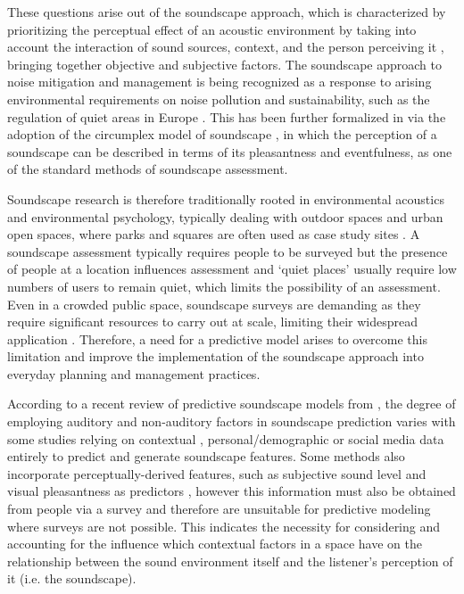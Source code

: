 These questions arise out of the soundscape approach, which is characterized by prioritizing the perceptual effect of an acoustic environment by taking into account the interaction of sound sources, context, and the person perceiving it \citep{international_organisation_for_standardization_iso_2014, truax_handbook_1999}, bringing together objective and subjective factors. The soundscape approach to noise mitigation and management is being recognized as a response to arising environmental requirements on noise pollution and sustainability, such as the regulation of quiet areas in Europe \citep{european_environment_agency_environmental_2020, kang_impact_2018, radicchi_sound_2021}. This has been further formalized in \citet{international_organisation_for_standardization_isots_2018} via the adoption of the circumplex model of soundscape \citep{axelsson_principal_2010}, in which the perception of a soundscape can be described in terms of its pleasantness and eventfulness, as one of the standard methods of soundscape assessment.

Soundscape research is therefore traditionally rooted in environmental acoustics and environmental psychology, typically dealing with outdoor spaces \citep{torresin_indoor_2020} and urban open spaces, where parks and squares are often used as case study sites \citep{kang_urban_2007}. A soundscape assessment typically requires people to be surveyed but the presence of people at a location influences assessment \citep{aletta_towards_2018} and ‘quiet places’ usually require low numbers of users to remain quiet, which limits the possibility of an assessment. Even in a crowded public space, soundscape surveys are demanding as they require significant resources to carry out at scale, limiting their widespread application \citep{mitchell_soundscape_2020}. Therefore, a need for a predictive model arises to overcome this limitation and improve the implementation of the soundscape approach into everyday planning and management practices.

According to a recent review of predictive soundscape models from \citet{lionello_systematic_2020}, the degree of employing auditory and non-auditory factors in soundscape prediction varies with some studies relying on contextual \citep{kajihara_imaginary_2017}, personal/demographic \citep{erfanian_psychological_2020, tarlao_investigating_2021} or social media \citep{aiello_chatty_2016} data entirely to predict and generate soundscape features. Some methods also incorporate perceptually-derived features, such as subjective sound level and visual pleasantness as predictors \citep{lionello_systematic_2020}, however this information must also be obtained from people via a survey and therefore are unsuitable for predictive modeling where surveys are not possible. This indicates the necessity for considering and accounting for the influence which contextual factors in a space have on the relationship between the sound environment itself and the listener's perception of it (i.e. the soundscape). 

